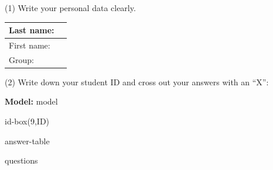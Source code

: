 \documentclass[a4paper,11pt]{article}
\begin{document}
\vspace{0.2cm}

\begin{center}
(1) Write your personal data clearly.
\end{center}

\begin{center}
\large

\begin{tabular}{|l|p{12cm}|}
\hline
Last name:   &  \\
\hline
First name: &    \\
\hline
Group:   &  \\
\hline
\end{tabular}
\end{center}

\vspace{0.2cm}

\begin{center}
(2) Write down your student ID and cross out your answers with an ``X'':
\end{center}

\begin{center}
\large
\textbf{Model:} {{model}}
\end{center}

{{id-box(9,ID)}}

{{answer-table}}

\clearpage

{{questions}}
\end{document}

